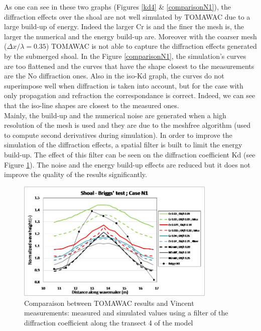 As one can see in these two graphs (Figures \ref{kd4} \& \ref{comparisonN1}), the diffraction effects over the shoal are not well simulated by TOMAWAC due to a large build-up of energy. Indeed the larger Cr is and the finer the mesh is, the larger the numerical and the energy build-up are. Moreover with the coarser mesh ($\Delta x / \lambda = 0.35$) TOMAWAC is not able to capture the diffraction effects generated by the submerged shoal. In the Figure \ref{comparisonN1}, the simulation's curves are too flattened and the curves that have the shape closest to the measurements are the No diffraction ones. Also in the iso-Kd graph, the curves do not superimpose well when diffraction is taken into account, but for the case with only propagation and refraction the correspondance is correct. Indeed, we can see that the iso-line shapes are closest to the measured ones.\\
Mainly, the build-up and the numerical noise are generated when a high resolution of the mesh is used and they are due to the meshfree algorithm (used to compute second derivatives during simulation).
In order to improve the simulation of the diffraction effects, a spatial filter is built to limit the energy build-up. The effect of this filter can be seen on the diffraction coefficient Kd (see Figure \ref{kdfilter}). The noise and the energy build-up effects are reduced but it does not improve the quality of the results significantly.\\

\begin{figure}[H]
  \centering
    \includegraphics[width=0.85\textwidth]{kd_filter.jpg}
      \caption{Comparaison between TOMAWAC results and Vincent measurements: measured and simulated values using a filter of the diffraction coefficient along the transect 4 of the model}
\label{kdfilter}
\end{figure}

